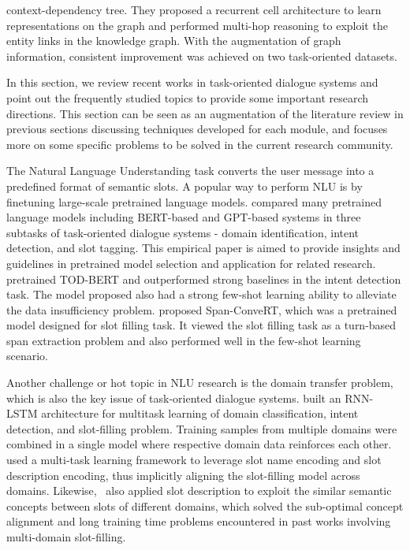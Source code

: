 context-dependency tree. They proposed a recurrent cell architecture to learn representations on the graph and performed multi-hop reasoning to exploit the entity links in the knowledge graph. With the augmentation of graph information, consistent improvement was achieved on two task-oriented datasets.

\label{Research Challenges and Hot Topics}
In this section, we review recent works in task-oriented dialogue systems and point out the frequently studied topics to provide some important research directions. This section can be seen as an augmentation of the literature review in previous sections discussing techniques developed for each module, and focuses more on some specific problems to be solved in the current research community.

The Natural Language Understanding task converts the user message into a predefined format of semantic slots. A popular way to perform NLU is by finetuning large-scale pretrained language models.  compared many pretrained language models including BERT-based and GPT-based systems in three subtasks of task-oriented dialogue systems - domain identification, intent detection, and slot tagging. This empirical paper is aimed to provide insights and guidelines in pretrained model selection and application for related research.  pretrained TOD-BERT and outperformed strong baselines in the intent detection task. The model proposed also had a strong few-shot learning ability to alleviate the data insufficiency problem.  proposed Span-ConveRT, which was a pretrained model designed for slot filling task. It viewed the slot filling task as a turn-based span extraction problem and also performed well in the few-shot learning scenario.

Another challenge or hot topic in NLU research is the domain transfer problem, which is also the key issue of task-oriented dialogue systems.  built an RNN-LSTM architecture for multitask learning of domain classification, intent detection, and slot-filling problem. Training samples from multiple domains were combined in a single model where respective domain data reinforces each other.  used a multi-task learning framework to leverage slot name encoding and slot description encoding, thus implicitly aligning the slot-filling model across domains. Likewise,~ also applied slot description to exploit the similar semantic concepts between slots of different domains, which solved the sub-optimal concept alignment and long training time problems encountered in past works involving multi-domain slot-filling.

